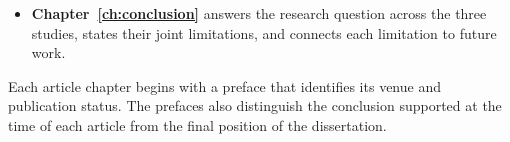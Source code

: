 \begin{itemize}
    author.
    \item \textbf{Chapter~\ref{ch:conclusion}} answers the research question across the
    three studies, states their joint limitations, and connects each limitation
    to future work.
\end{itemize}

Each article chapter begins with a preface that identifies its venue and publication
status. The prefaces also distinguish the conclusion supported at the time of each
article from the final position of the dissertation.


